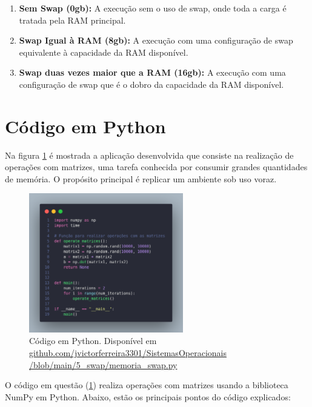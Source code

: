 \documentclass[
	12pt,				%
	openright,			%
	oneside,			%
	a4paper,			%
	chapter=TITLE,		%
	english,			%
	french,				%
	spanish,			%
	brazil				%
	]{abntex2}
\theoremstyle{definition}
\begin{document}
\begin{enumerate}
    \item \textbf{Sem Swap (0gb):} A execução sem o uso de swap, onde toda a carga é tratada pela RAM principal.
    \item \textbf{Swap Igual à RAM (8gb):} A execução com uma configuração de swap equivalente à capacidade da RAM disponível.
    \item \textbf{Swap duas vezes maior que a RAM (16gb):} A execução com uma configuração de swap que é o dobro da capacidade da RAM disponível.
\end{enumerate}

\section{Código em Python}

Na figura \ref{fig:swapy} é mostrada a aplicação desenvolvida que consiste na realização de operações 
com matrizes, uma tarefa conhecida por consumir grandes quantidades de memória. O propósito principal 
é replicar um ambiente sob uso voraz.

\begin{figure}[H]
	\centering
	\includegraphics[width=0.6\textwidth]{swapy.png}
	\caption{Código em Python. Disponível em \href{https://github.com/jvictorferreira3301/Sistemas_Operacionais/blob/main/5_swap/memoria_swap.py}{github.com/jvictorferreira3301/SistemasOperacionais
	/blob/main/5\_swap/memoria\_swap.py}}
	\label{fig:swapy}
\end{figure}


O código em questão (\ref{fig:swapy}) realiza operações com matrizes usando a biblioteca NumPy em Python. 
Abaixo, estão os principais pontos do código explicados:
\end{document}
